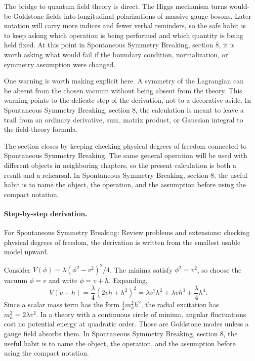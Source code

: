 The bridge to quantum field theory is direct.  The Higgs mechanism turns would-be Goldstone fields into longitudinal polarizations of massive gauge bosons.  Later notation will carry more indices and fewer verbal reminders, so the safe habit is to keep asking which operation is being performed and which quantity is being held fixed.  At this point in Spontaneous Symmetry Breaking, section 8, it is worth asking what would fail if the boundary condition, normalization, or symmetry assumption were changed.

One warning is worth making explicit here.  A symmetry of the Lagrangian can be absent from the chosen vacuum without being absent from the theory.  This warning points to the delicate step of the derivation, not to a decorative aside.  In Spontaneous Symmetry Breaking, section 8, the calculation is meant to leave a trail from an ordinary derivative, sum, matrix product, or Gaussian integral to the field-theory formula.

The section closes by keeping checking physical degrees of freedom connected to Spontaneous Symmetry Breaking.  The same general operation will be used with different objects in neighboring chapters, so the present calculation is both a result and a rehearsal.  In Spontaneous Symmetry Breaking, section 8, the useful habit is to name the object, the operation, and the assumption before using the compact notation.



\paragraph{Step-by-step derivation.}

For Spontaneous Symmetry Breaking: Review problems and extensions: checking physical degrees of freedom, the derivation is written from the smallest usable model upward.

Consider \(V(\phi)=\lambda(\phi^2-v^2)^2/4\).  The minima satisfy \(\phi^2=v^2\), so choose the vacuum \(\phi=v\) and write \(\phi=v+h\).  Expanding,
\[
  V(v+h)=\frac{\lambda}{4}(2vh+h^2)^2
  =\lambda v^2h^2+\lambda vh^3+\frac{\lambda}{4}h^4.
\]
Since a scalar mass term has the form \(\frac12m_h^2h^2\), the radial excitation has \(m_h^2=2\lambda v^2\).  In a theory with a continuous circle of minima, angular fluctuations cost no potential energy at quadratic order.  Those are Goldstone modes unless a gauge field absorbs them.  In Spontaneous Symmetry Breaking, section 8, the useful habit is to name the object, the operation, and the assumption before using the compact notation.

